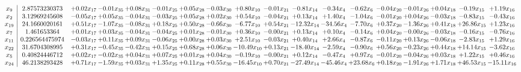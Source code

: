 \documentclass[9pt]{article}
\begin{document}
 \[\begin{array}{c| c c@{\hskip 2pt} c@{\hskip 2pt} c@{\hskip 2pt} c@{\hskip 2pt} c@{\hskip 2pt} c@{\hskip 2pt} c@{\hskip 2pt} c@{\hskip 2pt} c@{\hskip 2pt} c@{\hskip 2pt} c@{\hskip 2pt} c@{\hskip 2pt} c@{\hskip 2pt} c@{\hskip 2pt} c@{\hskip 2pt} c@{\hskip 2pt} }
 x_{9}   &  2.87573230373 & +  0.02 x_{17} & -0.01 x_{35} & +  0.08 x_{31} & -0.01 x_{25} & +  0.05 x_{28} & -0.03 x_{30} & +  0.80 x_{10} & -0.01 x_{21} & -0.81 x_{14} & -0.34 x_{4} & -0.62 x_{6} & -0.04 x_{20} & -0.01 x_{26} & +  0.04 x_{18} & -0.19 x_{15} & +  1.19 x_{16}\\
 x_{2}   &  3.12969245608 & -0.05 x_{17} & +  0.05 x_{35} & -0.04 x_{31} & -0.03 x_{25} & +  0.05 x_{28} & +  0.02 x_{30} & +  0.54 x_{10} & -0.04 x_{21} & +  0.13 x_{14} & +  1.40 x_{4} & -1.04 x_{6} & -0.01 x_{20} & +  0.04 x_{26} & -0.03 x_{18} & -0.83 x_{15} & -0.43 x_{16}\\
 x_{19}   &  24.1660020161 & +  0.51 x_{17} & -1.07 x_{35} & -0.08 x_{31} & +  0.18 x_{25} & +  0.50 x_{28} & -0.66 x_{30} & -6.77 x_{10} & +  0.54 x_{21} & -12.32 x_{14} & -34.56 x_{4} & -7.70 x_{6} & +  0.37 x_{20} & -1.36 x_{26} & +  0.41 x_{18} & + 26.86 x_{15} & +  1.23 x_{16}\\
 x_{7}   &  1.461653364 & +  0.01 x_{17} & +  0.03 x_{35} & -0.04 x_{31} & -0.04 x_{25} & +  0.01 x_{28} & -0.01 x_{30} & +  0.36 x_{10} & -0.00 x_{21} & +  0.13 x_{14} & +  0.10 x_{4} & -0.14 x_{6} & +  0.04 x_{20} & -0.00 x_{26} & -0.03 x_{18} & -0.16 x_{15} & -0.76 x_{16}\\
 x_{11}   &  0.226564475974 & -0.03 x_{17} & +  0.11 x_{35} & +  0.09 x_{31} & -0.06 x_{25} & +  0.00 x_{28} & +  0.03 x_{30} & +  2.51 x_{10} & -0.03 x_{21} & +  0.40 x_{14} & +  2.66 x_{4} & -0.87 x_{6} & -0.11 x_{20} & +  0.13 x_{26} & -0.06 x_{18} & -2.83 x_{15} & +  1.29 x_{16}\\
 x_{22}   &  31.6704308995 & +  0.31 x_{17} & -0.45 x_{35} & -0.42 x_{31} & +  0.15 x_{25} & +  0.68 x_{28} & +  0.06 x_{30} & -10.49 x_{10} & +  0.13 x_{21} & -18.40 x_{14} & -2.59 x_{4} & -0.90 x_{6} & +  0.56 x_{20} & -0.23 x_{26} & +  0.44 x_{18} & + 14.14 x_{15} & -3.62 x_{16}\\
 x_{5}   &  0.40824446712 & +  0.02 x_{17} & -0.02 x_{35} & +  0.04 x_{31} & +  0.07 x_{25} & +  0.01 x_{28} & +  0.04 x_{30} & -0.19 x_{10} & -0.00 x_{21} & +  0.12 x_{14} & -0.47 x_{4} & +  0.97 x_{6} & -0.01 x_{20} & -0.04 x_{26} & +  0.03 x_{18} & +  1.22 x_{15} & +  0.46 x_{16}\\
 x_{24}   &  46.2138293428 & +  0.71 x_{17} & -1.59 x_{35} & +  0.03 x_{31} & +  1.35 x_{25} & +  0.11 x_{28} & +  0.55 x_{30} & -16.45 x_{10} & +  0.70 x_{21} & -27.49 x_{14} & -45.46 x_{4} & + 23.68 x_{6} & +  0.18 x_{20} & -1.91 x_{26} & +  1.71 x_{18} & + 46.53 x_{15} & -15.11 x_{16}\\

\end{array}\]
\end{document}
